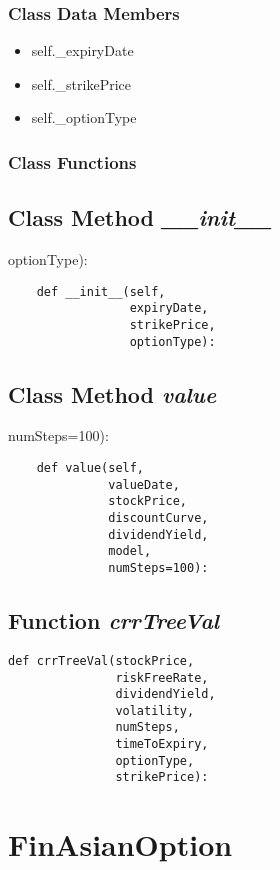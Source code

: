 \documentclass[twoside,11pt]{book}
\begin{document}
\subsubsection{Class Data Members}
\begin{itemize}
\item{self.\_expiryDate}
\item{self.\_strikePrice}
\item{self.\_optionType}
\end{itemize}

\subsubsection{Class Functions}

\subsection{Class Method {\it \_\_init\_\_}}
optionType):

\begin{lstlisting}
    def __init__(self,
                 expiryDate,
                 strikePrice,
                 optionType):
\end{lstlisting}

\subsection{Class Method {\it value}}
numSteps=100):

\begin{lstlisting}
    def value(self,
              valueDate,
              stockPrice,
              discountCurve,
              dividendYield,
              model,
              numSteps=100):
\end{lstlisting}

\subsection{Function {\it crrTreeVal}}


\begin{lstlisting}
def crrTreeVal(stockPrice,
               riskFreeRate,
               dividendYield,
               volatility,
               numSteps,
               timeToExpiry,
               optionType,
               strikePrice):
\end{lstlisting}

\newpage
\section{FinAsianOption}
\end{document}
